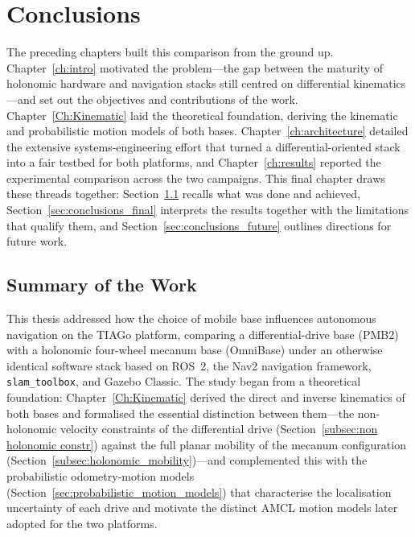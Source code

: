 
\chapter{Conclusions}
\label{ch:conclusions}

The preceding chapters built this comparison from the ground up. Chapter~\ref{ch:intro} motivated the
problem---the gap between the maturity of holonomic hardware and navigation stacks still centred
on differential kinematics---and set out the objectives and contributions of the work.
Chapter~\ref{Ch:Kinematic} laid the theoretical foundation, deriving the kinematic and probabilistic motion models of both bases. Chapter~\ref{ch:architecture} detailed the extensive systems-engineering effort that turned a differential-oriented stack into a fair testbed for both platforms, and Chapter~\ref{ch:results} reported the experimental comparison across the two campaigns. This final chapter draws these threads together: Section~\ref{sec:conclusions_summary} recalls what was done and achieved, Section~\ref{sec:conclusions_final} interprets the results together with the limitations that qualify them, and Section~\ref{sec:conclusions_future} outlines directions for future work.

\section{Summary of the Work}
\label{sec:conclusions_summary}

This thesis addressed how the choice of mobile base influences autonomous navigation on the TIAGo platform, comparing a differential-drive base (PMB2) with a holonomic four-wheel mecanum base (OmniBase) under an otherwise identical software stack based on ROS~2, the Nav2 navigation framework, \texttt{slam\_toolbox}, and Gazebo Classic. The study began from a theoretical foundation: Chapter~\ref{Ch:Kinematic} derived the direct and inverse kinematics of both bases and formalised the essential distinction between them---the non-holonomic velocity constraints of the differential drive (Section~\ref{subsec:non holonomic constr}) against the full planar mobility of the mecanum configuration (Section~\ref{subsec:holonomic_mobility})---and complemented this with the probabilistic odometry-motion models (Section~\ref{sec:probabilistic_motion_models}) that characterise the localisation uncertainty of each drive and motivate the distinct AMCL motion models later adopted for the two platforms.

